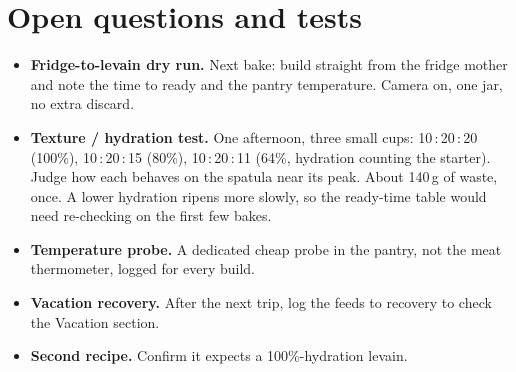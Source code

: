 \documentclass[11pt]{article}
\newcommand{\todo}{\item[$\square$]}
\newcommand{\feed}[3]{#1\,:\,#2\,:\,#3}   %
\begin{document}
\section*{Open questions and tests}

\begin{itemize}[label={}]
  \todo \textbf{Fridge-to-levain dry run.} Next bake: build straight from the fridge
        mother and note the time to ready and the pantry temperature. Camera on, one
        jar, no extra discard.
  \todo \textbf{Texture / hydration test.} One afternoon, three small cups:
        \feed{10}{20}{20} (100\%), \feed{10}{20}{15} (80\%), \feed{10}{20}{11} (64\%,
        hydration counting the starter). Judge how each behaves on the spatula near
        its peak. About 140\,g of waste, once. A lower hydration ripens more slowly, so
        the ready-time table would need re-checking on the first few bakes.
  \todo \textbf{Temperature probe.} A dedicated cheap probe in the pantry, not the
        meat thermometer, logged for every build.
  \todo \textbf{Vacation recovery.} After the next trip, log the feeds to recovery
        to check the Vacation section.
  \todo \textbf{Second recipe.} Confirm it expects a 100\%-hydration levain.
\end{itemize}
\end{document}
